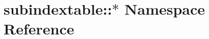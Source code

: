 \hypertarget{namespacesubindextable_1_1_5}{
\section{subindextable::$\ast$ Namespace Reference}
\label{namespacesubindextable_1_1_5}
}


